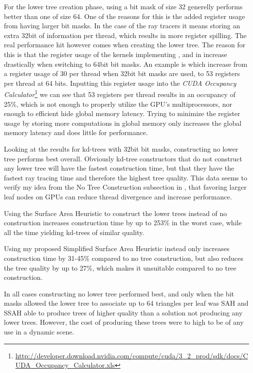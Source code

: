 For the lower tree creation phase, using a bit mask of size 32 generelly
performs better than one of size 64. One of the reasons for this is the added
register usage from having larger bit masks. In the case of the ray tracers it
means storing an extra 32bit of information per thread, which results in more
register spilling. The real performance hit however comes when creating the
lower tree. The reason for this is that the register usage of the kernels
implementing ,  and
 in  increase
drastically when switching to 64bit bit masks. An example is
 which increase from a register usage of 30 per
thread when 32bit bit masks are used, to 53 registers per thread at 64
bits. Inputting this register usage into the \textit{CUDA Occupancy
  Calculator}\footnote{\url{http://developer.download.nvidia.com/compute/cuda/3_2_prod/sdk/docs/CUDA_Occupancy_Calculator.xls}}
we can see that 53 registers per thread results in an occupancy of 25\%, which
is not enough to properly utilize the GPU's multiprocessors, nor enough to
efficient hide global memory latency. Trying to minimize the register usage by
storing more computations in global memory only increases the global memory
latency and does little for performance.

Looking at the results for kd-trees with 32bit bit masks, constructing no lower
tree performs best overall. Obviously kd-tree constructors that do not construct
any lower tree will have the fastest construction time, but that they have the
fastest ray tracing time and therefore the highest tree quality. This data seems
to verify my idea from the No Tree Construction subsection in
, that favoring larger leaf nodes on GPUs can reduce
thread divergence and increase performance.

Using the Surface Area Heuristic to construct the lower trees instead of no
construction increases construction time by up to 253\% in the worst case, while
all the time yielding kd-trees of similar quality.

Using my proposed Simplified Surface Area Heuristic instead only increases
construction time by 31-45\% compared to no tree construction, but also reduces
the tree quality by up to 27\%, which makes it unsuitable compared to no tree
construction.

In all cases constructing no lower tree performed best, and only when the bit
masks allowed the lower tree to associate up to 64 triangles per leaf was SAH
and SSAH able to produce trees of higher quality than a solution not producing
any lower trees. However, the cost of producing these trees were to high to be
of any use in a dynamic scene.



